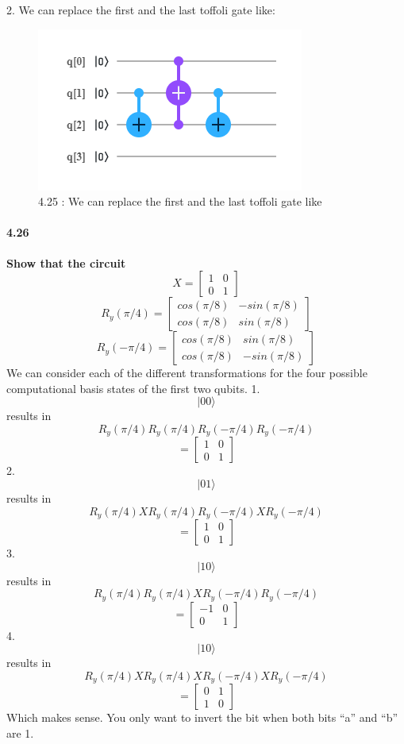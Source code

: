 2. We can replace the first and the last toffoli gate like:

\begin{figure}[h!]
    \centering
    \includegraphics{Chapter 4/4.25(1).png}
    \caption{4.25 : We can replace the first and the last toffoli gate like}
    \label{fig:my_label}
\end{figure}


\paragraph{4.26} \textbf{Show that the circuit}
\\
$$X = \begin{bmatrix} 1 & 0\\0 & 1 \end{bmatrix}$$     $$R_y(\pi /4) = \begin{bmatrix} cos(\pi /8) & -sin(\pi /8)\\cos(\pi /8) & sin(\pi /8) \end{bmatrix}$$     $$R_y(-\pi /4) = \begin{bmatrix} cos(\pi /8) & sin(\pi /8)\\cos(\pi /8) & -sin(\pi /8) \end{bmatrix}$$
We can consider each of the different transformations for the four possible computational basis states of the first two qubits.
1. $$|00\rangle$$ results in $$R_y(\pi /4)R_y(\pi /4)R_y(-\pi /4)R_y(-\pi /4)$$
$$= \begin{bmatrix}1 & 0\\0 & 1\end{bmatrix}$$
2. $$|01\rangle$$ results in $$R_y(\pi /4)XR_y(\pi /4)R_y(-\pi /4)XR_y(-\pi /4)$$
$$= \begin{bmatrix}1 & 0\\0 & 1\end{bmatrix}$$
3. $$|10\rangle$$ results in $$R_y(\pi /4)R_y(\pi /4)XR_y(-\pi /4)R_y(-\pi /4)$$
$$= \begin{bmatrix}-1 & 0\\0& 1\end{bmatrix}$$
4. $$|10\rangle$$ results in $$R_y(\pi /4)XR_y(\pi /4)XR_y(-\pi /4)XR_y(-\pi /4)$$
$$= \begin{bmatrix}0 & 1\\1& 0\end{bmatrix}$$
Which makes sense. You only want to invert the bit when both bits “a” and “b” are 1. 

